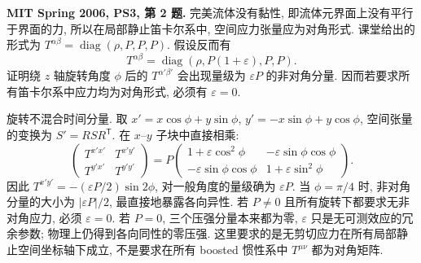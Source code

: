 \begin{exercise}
\textbf{MIT Spring 2006, PS3, 第 2 题.} 完美流体没有黏性, 即流体元界面上没有平行于界面的力, 所以在局部静止笛卡尔系中, 空间应力张量应为对角形式. 课堂给出的形式为 $T^{\alpha\beta}=\operatorname{diag}(\rho,P,P,P)$. 假设反而有
\[
 T^{\alpha\beta}=\operatorname{diag}(\rho,P(1+\varepsilon),P,P).
\]
证明绕 $z$ 轴旋转角度 $\phi$ 后的 $T^{\alpha'\beta'}$ 会出现量级为 $\varepsilon P$ 的非对角分量. 因而若要求所有笛卡尔系中应力均为对角形式, 必须有 $\varepsilon=0$.
\end{exercise}
\begin{solution}
旋转不混合时间分量. 取 $x'=x\cos\phi+y\sin\phi$, $y'=-x\sin\phi+y\cos\phi$, 空间张量的变换为 $S'=RSR^{\mathsf T}$. 在 $x$--$y$ 子块中直接相乘:
\[
 \begin{pmatrix}T^{x'x'}&T^{x'y'}\\T^{y'x'}&T^{y'y'}\end{pmatrix}
 =P\begin{pmatrix}
 1+\varepsilon\cos^2\phi&-\varepsilon\sin\phi\cos\phi\\
 -\varepsilon\sin\phi\cos\phi&1+\varepsilon\sin^2\phi
 \end{pmatrix}.
\]
因此 $T^{x'y'}=-(\varepsilon P/2)\sin2\phi$, 对一般角度的量级确为 $\varepsilon P$. 当 $\phi=\pi/4$ 时, 非对角分量的大小为 $|\varepsilon P|/2$, 最直接地暴露各向异性. 若 $P\ne0$ 且所有旋转下都要求无非对角应力, 必须 $\varepsilon=0$. 若 $P=0$, 三个压强分量本来都为零, $\varepsilon$ 只是无可测效应的冗余参数; 物理上仍得到各向同性的零压强. 这里要求的是无剪切应力在所有局部静止空间坐标轴下成立, 不是要求在所有 boosted 惯性系中 $T^{\mu\nu}$ 都为对角矩阵.
\end{solution}

